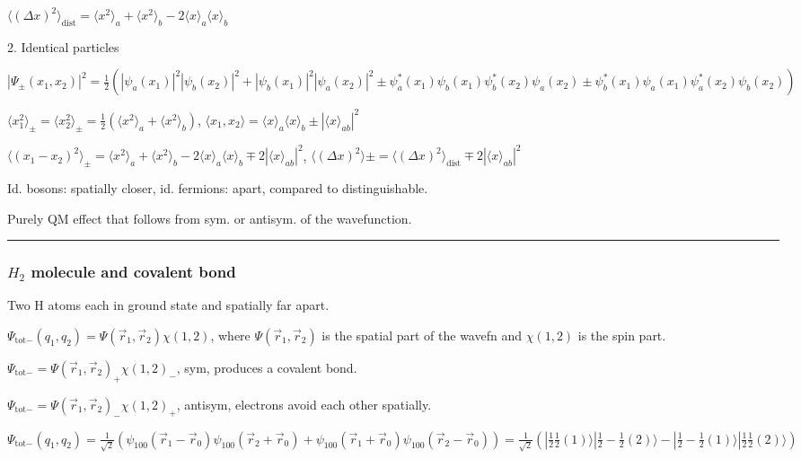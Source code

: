 $\langle (\Delta x)^2 \rangle_{\textrm{dist}} = \langle x^2 \rangle_a + \langle x^2 \rangle_b - 2 \langle x \rangle_a \langle x \rangle_b$

2. Identical particles

$|\Psi_{\pm}(x_1, x_2)|^2 = \frac{1}{2}(|\psi_a(x_1)|^2 |\psi_b(x_2)|^2 + |\psi_b(x_1)|^2 |\psi_a(x_2)|^2 \pm \psi^{*}_a(x_1) \psi_b(x_1) \psi_b^*(x_2) \psi_a(x_2) \pm \psi_b^*(x_1)\psi_a(x_1) \psi_a^*(x_2) \psi_b(x_2))$

$\langle x_1^2 \rangle_{\pm} = \langle x_2^2 \rangle_{\pm} = \frac{1}{2} (\langle x^2 \rangle_a + \langle x^2 \rangle_b)$, $\langle x_1, x_2 \rangle = \langle x \rangle_a \langle x \rangle_b \pm |\langle x \rangle_{ab}|^2$

$\langle (x_1 - x_2)^2 \rangle_{\pm} = \langle x^2 \rangle_a + \langle x^2 \rangle_b - 2 \langle x \rangle_a \langle x \rangle_b \mp 2|\langle x \rangle_{ab}|^2$, $\langle (\Delta x)^2 \rangle \pm = \langle (\Delta x)^2 \rangle_{\textrm{dist}} \mp 2 | \langle x \rangle_{ab}|^2$

Id. bosons: spatially closer, id. fermions: apart, compared to distinguishable.

Purely QM effect that follows from sym. or antisym. of the wavefunction.

\hrule height 0.07pt

\subsubsection{$H_2$ molecule and covalent bond}
Two H atoms each in ground state and spatially far apart.

$\Psi_{\textrm{tot}-}(q_1, q_2) = \Psi(\vec{r}_1, \vec{r}_2) \chi(1, 2)$, where $\Psi(\vec{r}_1, \vec{r}_2)$ is the spatial part of the wavefn and $\chi(1, 2)$ is the spin part.

$\Psi_{\textrm{tot}-} = \Psi(\vec{r}_1, \vec{r}_2)_{+} \chi(1, 2)_{-}$, sym, produces a covalent bond.

$\Psi_{\textrm{tot}-} = \Psi(\vec{r}_1, \vec{r}_2)_{-} \chi(1, 2)_{+}$, antisym, electrons avoid each other spatially.

$\Psi_{\textrm{tot}-}(q_1, q_2) = \frac{1}{\sqrt{2}}(\psi_{100}(\vec{r}_1 - \vec{r}_0) \psi_{100}(\vec{r}_2 + \vec{r}_0) + \psi_{100}(\vec{r}_1 + \vec{r}_0) \psi_{100}(\vec{r}_2 - \vec{r}_0)) = \frac{1}{\sqrt{2}} (|\frac{1}{2} \frac{1}{2} (1) \rangle | \frac{1}{2} -\frac{1}{2} (2) \rangle - | \frac{1}{2} -\frac{1}{2}(1) \rangle | \frac{1}{2} \frac{1}{2} (2) \rangle)$

